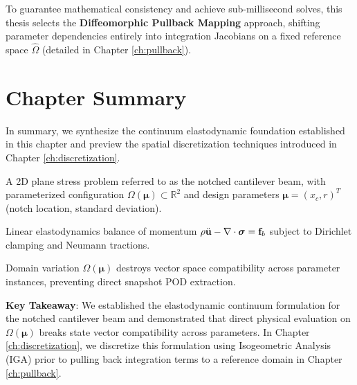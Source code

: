 To guarantee mathematical consistency and achieve sub-millisecond solves, this thesis selects the \textbf{Diffeomorphic Pullback Mapping} approach, shifting parameter dependencies entirely into integration Jacobians on a fixed reference space $\hat{\Omega}$ (detailed in Chapter \ref{ch:pullback}).

\section{Chapter Summary}

In summary, we synthesize the continuum elastodynamic foundation established in this chapter and preview the spatial discretization techniques introduced in Chapter \ref{ch:discretization}.

\begin{tcolorbox}[colback=lightbg, colframe=primaryblue, title=\textbf{Chapter Summary: Continuum Mechanics \& Shape Parameterization}, fonttitle=\bfseries]
    \begin{description}[leftmargin=!, labelwidth=3.4cm]
        \item[\textbf{Physical Domain}] A 2D plane stress problem referred to as the notched cantilever beam, with parameterized configuration $\Omega(\boldsymbol{\mu}) \subset \mathbb{R}^2$ and design parameters $\boldsymbol{\mu} = (x_c, r)^T$ (notch location, standard deviation).
        \item[\textbf{Governing Law}] Linear elastodynamics balance of momentum $\rho \ddot{\mathbf{u}} - \nabla \cdot \boldsymbol{\sigma} = \mathbf{f}_b$ subject to Dirichlet clamping and Neumann tractions.
        \item[\textbf{Core Bottleneck}] Domain variation $\Omega(\boldsymbol{\mu})$ destroys vector space compatibility across parameter instances, preventing direct snapshot POD extraction.
    \end{description}
    
    \vspace{0.2cm}
    \textbf{Key Takeaway}: We established the elastodynamic continuum formulation for the notched cantilever beam and demonstrated that direct physical evaluation on $\Omega(\boldsymbol{\mu})$ breaks state vector compatibility across parameters. In Chapter \ref{ch:discretization}, we discretize this formulation using Isogeometric Analysis (IGA) prior to pulling back integration terms to a reference domain in Chapter \ref{ch:pullback}.
\end{tcolorbox}
